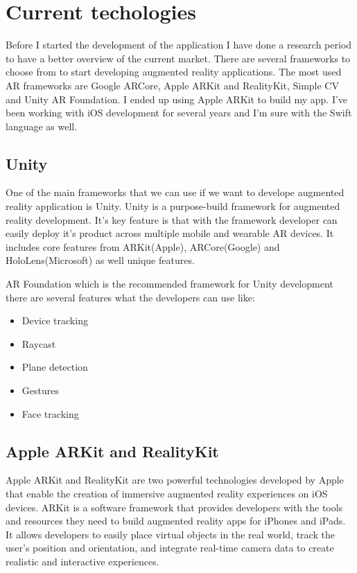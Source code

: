 \chapter{Current techologies}

Before I started the development of the application I have done a research period to have a better overview of the current market. There are several frameworks to choose from to start developing augmented reality applications. The most used AR frameworks are Google ARCore, Apple ARKit and RealityKit, Simple CV and Unity AR Foundation.
I ended up using Apple ARKit to build my app. I've been working with iOS development for several years and I'm sure with the Swift language as well.

\section{Unity}

One of the main frameworks that we can use if we want to develope augmented reality application is Unity.
Unity is a purpose-build framework for augmented reality development. It's key feature is that with the framework developer can easily deploy it's product across multiple mobile and wearable AR devices. It includes core features from ARKit(Apple), ARCore(Google) and HoloLens(Microsoft) as well unique features.

AR Foundation which is the recommended framework for Unity development there are several features what the developers can use like:
\begin{itemize}
    \item Device tracking
    \item Raycast
    \item Plane detection
    \item Gestures
    \item Face tracking
\end{itemize}

\section{Apple ARKit and RealityKit}

Apple ARKit and RealityKit are two powerful technologies developed by Apple that enable the creation of immersive augmented reality experiences on iOS devices. ARKit is a software framework that provides developers with the tools and resources they need to build augmented reality apps for iPhones and iPads. It allows developers to easily place virtual objects in the real world, track the user's position and orientation, and integrate real-time camera data to create realistic and interactive experiences.

